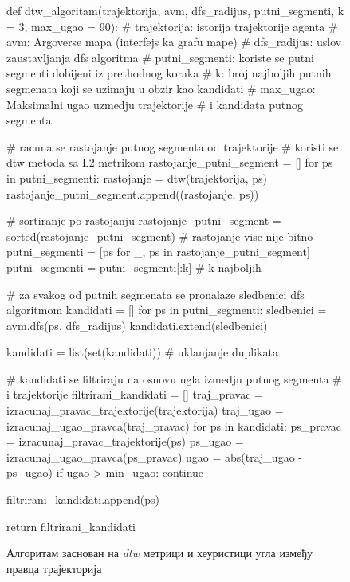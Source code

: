 \documentclass[11pt,oneside]{memoir}
\begin{document}
\begin{figure}
  \begin{python}
  def dtw_algoritam(trajektorija, avm, dfs_radijus, putni_segmenti, 
      k = 3, max_ugao = 90):
    # trajektorija: istorija trajektorije agenta 
    # avm: Argoverse mapa (interfejs ka grafu mape)
    # dfs_radijus: uslov zaustavljanja dfs algoritma
    # putni_segmenti: koriste se putni segmenti dobijeni iz prethodnog koraka
    # k: broj najboljih putnih segmenata koji se uzimaju u obzir kao kandidati
    # max_ugao: Maksimalni ugao uzmedju trajektorije 
    #           i kandidata putnog segmenta
    
    # racuna se rastojanje putnog segmenta od trajektorije
    # koristi se dtw metoda sa L2 metrikom
    rastojanje_putni_segment = []
    for ps in putni_segmenti:
      rastojanje = dtw(trajektorija, ps)
      rastojanje_putni_segment.append((rastojanje, ps))

    # sortiranje po rastojanju
    rastojanje_putni_segment = sorted(rastojanje_putni_segment)
    # rastojanje vise nije bitno
    putni_segmenti = [ps for _, ps in rastojanje_putni_segment]
    putni_segmenti = putni_segmenti[:k]  # k najboljih

    # za svakog od putnih segmenata se pronalaze sledbenici dfs algoritmom
    kandidati = []
    for ps in putni_segmenti:
      sledbenici = avm.dfs(ps, dfs_radijus)
      kandidati.extend(sledbenici)

    kandidati = list(set(kandidati))  # uklanjanje duplikata

    # kandidati se filtriraju na osnovu ugla izmedju putnog segmenta
    # i trajektorije
    filtrirani_kandidati = []
    traj_pravac = izracunaj_pravac_trajektorije(trajektorija)
    traj_ugao = izracunaj_ugao_pravca(traj_pravac)
    for ps in kandidati:
      ps_pravac = izracunaj_pravac_trajektorije(ps)
      ps_ugao = izracunaj_ugao_pravca(ps_pravac)
      ugao = abs(traj_ugao - ps_ugao)
      if ugao > min_ugao:
        continue
      
      filtrirani_kandidati.append(ps)

    return filtrirani_kandidati

  \end{python}
  \caption{Алгоритам заснован на \textit{dtw} метрици и хеуристици угла између правца трајекторија \label{dtw-algorithm}}
  \end{figure}
\end{document}
